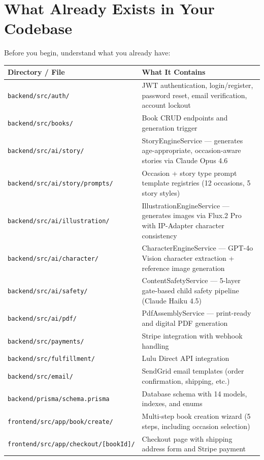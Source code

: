 \documentclass[12pt, letterpaper, oneside]{book}
\begin{document}
\section{What Already Exists in Your Codebase}

Before you begin, understand what you already have:

\begin{table}[H]
\centering
\small
\begin{tabularx}{\textwidth}{lX}
\toprule
\textbf{Directory / File} & \textbf{What It Contains} \\
\midrule
\texttt{backend/src/auth/} & JWT authentication, login/register, password reset, email verification, account lockout \\
\texttt{backend/src/books/} & Book CRUD endpoints and generation trigger \\
\texttt{backend/src/ai/story/} & StoryEngineService --- generates age-appropriate, occasion-aware stories via Claude Opus 4.6 \\
\texttt{backend/src/ai/story/prompts/} & Occasion + story type prompt template registries (12 occasions, 5 story styles) \\
\texttt{backend/src/ai/illustration/} & IllustrationEngineService --- generates images via Flux.2 Pro with IP-Adapter character consistency \\
\texttt{backend/src/ai/character/} & CharacterEngineService --- GPT-4o Vision character extraction + reference image generation \\
\texttt{backend/src/ai/safety/} & ContentSafetyService --- 5-layer gate-based child safety pipeline (Claude Haiku 4.5) \\
\texttt{backend/src/ai/pdf/} & PdfAssemblyService --- print-ready and digital PDF generation \\
\texttt{backend/src/payments/} & Stripe integration with webhook handling \\
\texttt{backend/src/fulfillment/} & Lulu Direct API integration \\
\texttt{backend/src/email/} & SendGrid email templates (order confirmation, shipping, etc.) \\
\texttt{backend/prisma/schema.prisma} & Database schema with 14 models, indexes, and enums \\
\texttt{frontend/src/app/book/create/} & Multi-step book creation wizard (5 steps, including occasion selection) \\
\texttt{frontend/src/app/checkout/[bookId]/} & Checkout page with shipping address form and Stripe payment \\

\end{tabularx}
\end{table}
\end{document}
